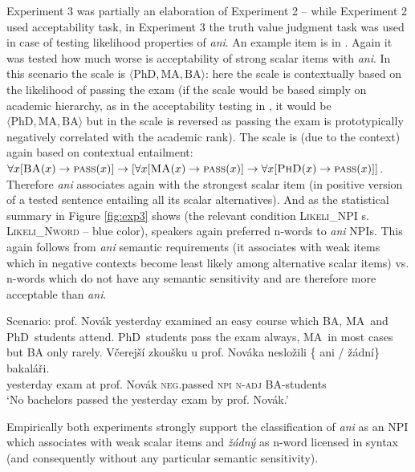 \documentclass[output=paper,
]{langscibook}
\begin{document}
Experiment 3 was partially an elaboration of Experiment 2 -- while Experiment 2 used acceptability task, in Experiment 3 the truth value judgment task was used in case of testing likelihood properties of \textit{ani}. An example item is in . Again it was tested how much worse is acceptability of strong scalar items with \textit{ani}. In this scenario the scale is $\langle \text{PhD}, \text{MA}, \text{BA}\rangle$: here the scale is contextually based on the likelihood of passing the exam (if the scale would be based simply on academic hierarchy, as in the acceptability testing in , it would be $\langle \text{PhD}, \text{MA}, \text{BA}\rangle$ but in  the scale is reversed as passing the exam is prototypically negatively correlated with the academic rank). The scale is (due to the context) again based on contextual entailment: $\forall x[\textsc{BA}(x) \rightarrow  \textsc{pass}(x)] \rightarrow [\forall x[\textsc{MA}(x) \rightarrow \textsc{pass}(x)] \rightarrow \forall x[\textsc{PhD}(x) \rightarrow \textsc{pass}(x)]]$. Therefore \textit{ani} associates again with the strongest scalar item (in positive version of a tested sentence entailing all its scalar alternatives). And as the statistical summary in Figure \ref{fig:exp3} shows (the relevant condition \textsc{Likeli\_NPI} s. \textsc{Likeli\_Nword} -- blue color), speakers again preferred n-words to \textit{ani} NPIs.  This again follows from \textit{ani} semantic requirements (it associates with weak items which in negative contexts become least likely among alternative scalar items)  vs. n-words which do not have any semantic sensitivity and are therefore more acceptable than \textit{ani}.

\eanoraggedright\label{ex-43} Scenario: prof. Novák yesterday examined an easy course which BA, MA~and PhD~students attend. PhD~students pass the exam always, MA~in most cases but BA only rarely.
\ea \gll Včerejší zkoušku u prof. Nováka nesložili \{\hspace{-2pt} ani / žádní\} bakaláři.\\
yesterday exam at prof. Novák \textsc{neg}.passed {} \textsc{npi} {} \textsc{n-adj} BA-students\\
\glt `No bachelors passed the yesterday exam by prof. Novák.'
\z
\z


\noindent Empirically both experiments strongly support the classification of \textit{ani} as an NPI which associates with weak scalar items and \textit{žádný} as n-word licensed in syntax (and consequently without any particular semantic sensitivity).
\end{document}
